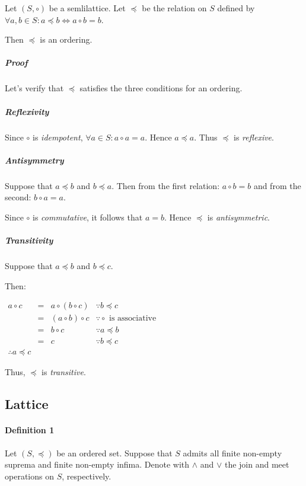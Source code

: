 Let $(S, \circ)$ be a semlilattice. Let $\preceq$ be the relation on
$S$ defined by $\forall a, b \in S: a \preceq b \iff a \circ b = b$.

Then $\preceq$ is an ordering.

\subparagraph{Proof}

Let's verify that $\preceq$ satisfies the three conditions for an
ordering.

\subparagraph{Reflexivity}

Since $\circ$ is \textit{idempotent},
$\forall a \in S: a \circ a = a$. Hence $a \preceq a$. Thus $\preceq$
is \textit{reflexive}.

\subparagraph{Antisymmetry}

Suppose that $a \preceq b$ and $b \preceq a$. Then from the first
relation: $a \circ b = b$ and from the second: $b \circ a =a$.

Since $\circ$ is \textit{commutative}, it follows that $a = b$. Hence
$\preceq$ is \textit{antisymmetric}.

\subparagraph{Transitivity}

Suppose that $a \preceq b$ and $b \preceq c$.

Then:

\begin{math}
  \begin{array}{lcll}
    a \circ c & = & a \circ (b \circ c) & \because b \preceq c \\
              & = & (a \circ b) \circ c & \because \circ \text{ is associative} \\
              & = & b \circ c & \because a \preceq b \\
              & = & c & \because b \preceq c \\
    \therefore a \preceq c
  \end{array}
\end{math}

Thus, $\preceq$ is \textit{transitive}.


\subsection{Lattice}
\label{sec:lattice}

\paragraph{Definition 1}

Let $(S, \preceq)$ be an ordered set. Suppose that $S$ admits all
finite non-empty suprema and finite non-empty infima. Denote with
$\wedge$ and $\vee$ the join and meet operations on $S$, respectively.

